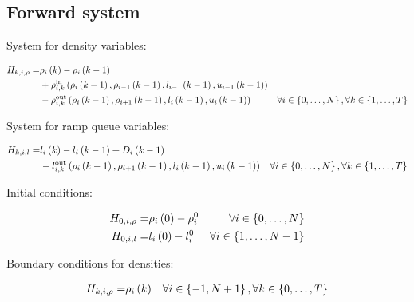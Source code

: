 \subsection{Forward system}

System for density variables:

\begin{align*}
H_{k,i,\rho}= & \rho_{i}\left(k\right)-\rho_{i}\left(k-1\right)\\
 & +\rho_{i,k}^{\text{in}}\left(\rho_{i}\left(k-1\right),\rho_{i-1}\left(k-1\right),l_{i-1}\left(k-1\right),u_{i-1}\left(k-1\right)\right)\\
 & -\rho_{i,k}^{\text{out}}\left(\rho_{i}\left(k-1\right),\rho_{i+1}\left(k-1\right),l_{i}\left(k-1\right),u_{i}\left(k-1\right)\right) & \forall i\in\left\{ 0,\ldots,N\right\} ,\forall k\in\left\{ 1,\ldots,T\right\} 
\end{align*}


System for ramp queue variables:

\begin{align*}
H_{k,i,l}= & l_{i}\left(k\right)-l_{i}\left(k-1\right)+D_{i}\left(k-1\right)\\
 & -l_{i,k}^{\text{out}}\left(\rho_{i}\left(k-1\right),\rho_{i+1}\left(k-1\right),l_{i}\left(k-1\right),u_{i}\left(k-1\right)\right) & \forall i\in\left\{ 0,\ldots,N\right\} ,\forall k\in\left\{ 1,\ldots,T\right\} 
\end{align*}


Initial conditions:

\begin{align*}
\mbox{\ensuremath{H_{0,i,\rho}}}= & \rho_{i}\left(0\right)-\rho_{i}^{0} & \forall i\in\left\{ 0,\ldots,N\right\} \\
H_{0,i,l}= & l_{i}\left(0\right)-l_{i}^{0} & \forall i\in\left\{ 1,\ldots,N-1\right\} 
\end{align*}


Boundary conditions for densities:

\begin{align*}
H_{k,i,\rho}= & \rho_{i}\left(k\right) & \forall i\in\left\{ -1,N+1\right\} ,\forall k\in\left\{ 0,\ldots,T\right\} 
\end{align*}


